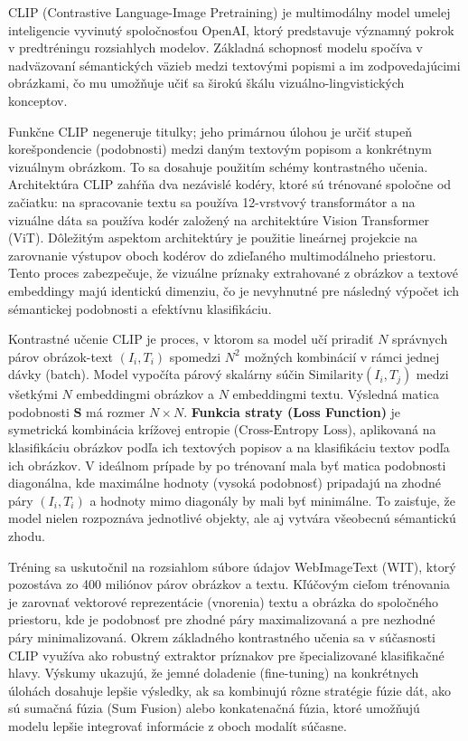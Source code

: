 \documentclass[]{tukediphc}
\begin{document}
CLIP (Contrastive Language-Image Pretraining) je multimodálny model umelej inteligencie vyvinutý spoločnosťou OpenAI, ktorý predstavuje významný pokrok v predtréningu rozsiahlych modelov. Základná schopnosť modelu spočíva v nadväzovaní sémantických väzieb medzi textovými popismi a im zodpovedajúcimi obrázkami, čo mu umožňuje učiť sa širokú škálu vizuálno-lingvistických konceptov.

Funkčne CLIP negeneruje titulky; jeho primárnou úlohou je určiť stupeň korešpondencie (podobnosti) medzi daným textovým popisom a konkrétnym vizuálnym obrázkom. To sa dosahuje použitím schémy kontrastného učenia. Architektúra CLIP zahŕňa dva nezávislé kodéry, ktoré sú trénované spoločne od začiatku: na spracovanie textu sa používa 12-vrstvový transformátor a na vizuálne dáta sa používa kodér založený na architektúre Vision Transformer (ViT)\cite{CLIParXiv:2210.08901}. Dôležitým aspektom architektúry je použitie lineárnej projekcie na zarovnanie výstupov oboch kodérov do zdieľaného multimodálneho priestoru. Tento proces zabezpečuje, že vizuálne príznaky extrahované z obrázkov a textové embeddingy majú identickú dimenziu, čo je nevyhnutné pre následný výpočet ich sémantickej podobnosti a efektívnu klasifikáciu\cite{MMCCLIP}.

Kontrastné učenie CLIP je proces, v ktorom sa model učí priradiť $N$ správnych párov obrázok-text $(I_i, T_i)$ spomedzi $N^2$ možných kombinácií v rámci jednej dávky (batch). Model vypočíta párový skalárny súčin $\text{Similarity}(I_i, T_j)$ medzi všetkými $N$ embeddingmi obrázkov a $N$ embeddingmi textu. Výsledná matica podobnosti $\mathbf{S}$ má rozmer $N \times N$. \textbf{Funkcia straty (Loss Function)} je symetrická kombinácia krížovej entropie ($\text{Cross-Entropy Loss}$), aplikovaná na klasifikáciu obrázkov podľa ich textových popisov a na klasifikáciu textov podľa ich obrázkov. V ideálnom prípade by po trénovaní mala byť matica podobnosti diagonálna, kde maximálne hodnoty (vysoká podobnosť) pripadajú na zhodné páry $(I_i, T_i)$ a hodnoty mimo diagonály by mali byť minimálne. To zaisťuje, že model nielen rozpoznáva jednotlivé objekty, ale aj vytvára všeobecnú sémantickú zhodu\cite{researchgate:Learning_Transferable_Visual_Models_From_Natural_Language_Supervision}.

Tréning sa uskutočnil na rozsiahlom súbore údajov WebImageText (WIT), ktorý pozostáva zo 400 miliónov párov obrázkov a textu. Kľúčovým cieľom trénovania je zarovnať vektorové reprezentácie (vnorenia) textu a obrázka do spoločného priestoru, kde je podobnosť pre zhodné páry maximalizovaná a pre nezhodné páry minimalizovaná. Okrem základného kontrastného učenia sa v súčasnosti CLIP využíva ako robustný extraktor príznakov pre špecializované klasifikačné hlavy. Výskumy ukazujú, že jemné doladenie (fine-tuning) na konkrétnych úlohách dosahuje lepšie výsledky, ak sa kombinujú rôzne stratégie fúzie dát, ako sú sumačná fúzia (Sum Fusion) alebo konkatenačná fúzia, ktoré umožňujú modelu lepšie integrovať informácie z oboch modalít súčasne\cite{MMCCLIP}.
\end{document}
